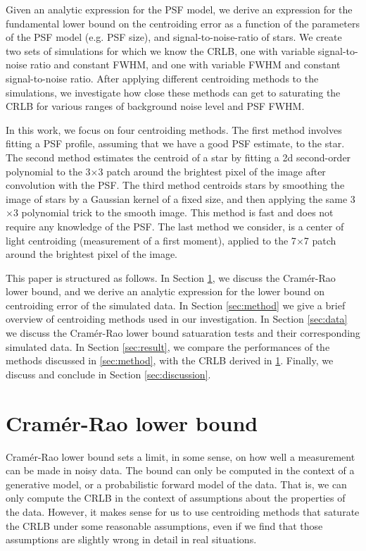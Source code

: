 \documentclass[12pt, preprint]{aastex}
\begin{document}
Given an analytic expression for the PSF model,
we derive an expression for the fundamental lower bound on the centroiding error as
a function of the parameters of the PSF model (e.g. PSF size),
and signal-to-noise-ratio of stars. We create two sets of simulations for which we 
know the CRLB, one with variable signal-to-noise ratio and constant FWHM, and one 
with variable FWHM and constant signal-to-noise ratio. After applying
different centroiding methods to the simulations,
we investigate how close these methods can get to saturating the CRLB for
various ranges of background noise level and PSF FWHM.

In this work, we focus on four centroiding methods. The first method
involves fitting a PSF profile, assuming that we have a good PSF estimate, to the star. 
The second method estimates the centroid of a star by fitting a 2d second-order polynomial to
 the 3$\times$3 patch around the brightest pixel of the image after convolution with the PSF. 
The third method centroids stars by
 smoothing the image of stars by a Gaussian kernel of a fixed size,
 and then applying the same 3$\times$3 polynomial trick to the smooth
 image. This method is fast and does not require any knowledge of the 
PSF. The last method we consider, is a center of light centroiding 
(measurement of a first moment), applied to the 
7$\times$7 patch around the brightest pixel of the image.

This paper is structured as follows. In Section \ref{sec:CRLB},
we discuss the Cram\'{e}r-Rao lower bound, and we derive
an analytic expression for the lower bound on centroiding error
of the simulated data. 
In Section \ref{sec:method} we give a brief overview of 
centroiding methods used in our investigation.
In Section \ref{sec:data} we discuss the Cram\'{e}r-Rao lower bound satuaration
tests and their corresponding simulated data.
In Section \ref{sec:result}, we compare the performances of the methods
discussed in \ref{sec:method}, with the CRLB derived in \ref{sec:CRLB}. Finally,
 we discuss and conclude in Section \ref{sec:discussion}.               


\section{Cram\'{e}r-Rao lower bound}\label{sec:CRLB}

Cram\'{e}r-Rao lower bound sets a limit, in some sense, on how well a measurement 
can be made in noisy data.  The bound can only be computed in the context of a 
generative model, or a probabilistic forward model of the data.  That is, we can 
only compute the CRLB in the context of assumptions about the properties of the data. 
However, it makes sense for us to use centroiding methods that saturate the CRLB under 
some reasonable assumptions, even if we find that those assumptions are slightly wrong 
in detail in real situations.
\end{document}

